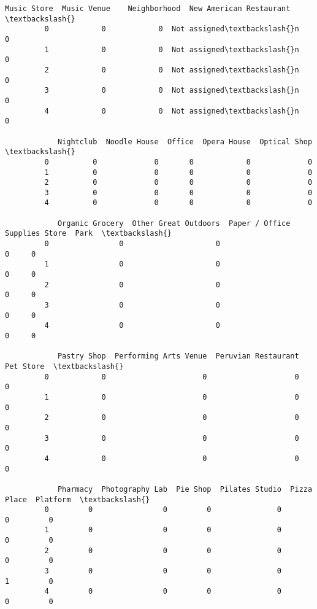 \documentclass[11pt]{article}
\begin{document}
\begin{Verbatim}[commandchars=\\\{\}]
            Music Store  Music Venue    Neighborhood  New American Restaurant  \textbackslash{}
         0            0            0  Not assigned\textbackslash{}n                        0   
         1            0            0  Not assigned\textbackslash{}n                        0   
         2            0            0  Not assigned\textbackslash{}n                        0   
         3            0            0  Not assigned\textbackslash{}n                        0   
         4            0            0  Not assigned\textbackslash{}n                        0   
         
            Nightclub  Noodle House  Office  Opera House  Optical Shop  \textbackslash{}
         0          0             0       0            0             0   
         1          0             0       0            0             0   
         2          0             0       0            0             0   
         3          0             0       0            0             0   
         4          0             0       0            0             0   
         
            Organic Grocery  Other Great Outdoors  Paper / Office Supplies Store  Park  \textbackslash{}
         0                0                     0                              0     0   
         1                0                     0                              0     0   
         2                0                     0                              0     0   
         3                0                     0                              0     0   
         4                0                     0                              0     0   
         
            Pastry Shop  Performing Arts Venue  Peruvian Restaurant  Pet Store  \textbackslash{}
         0            0                      0                    0          0   
         1            0                      0                    0          0   
         2            0                      0                    0          0   
         3            0                      0                    0          0   
         4            0                      0                    0          0   
         
            Pharmacy  Photography Lab  Pie Shop  Pilates Studio  Pizza Place  Platform  \textbackslash{}
         0         0                0         0               0            0         0   
         1         0                0         0               0            0         0   
         2         0                0         0               0            0         0   
         3         0                0         0               0            1         0   
         4         0                0         0               0            0         0   
         

\end{Verbatim}
\end{document}

